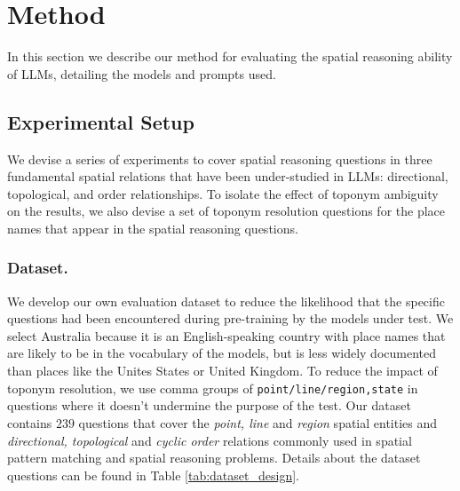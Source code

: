 \section{Method}
\label{section:method}

In this section we describe our method for evaluating the spatial reasoning ability of LLMs, detailing the models and prompts used.


\subsection{Experimental Setup}
We devise a series of experiments to cover spatial reasoning questions in three fundamental spatial relations that have been under-studied in LLMs: directional, topological, and order relationships.
To isolate the effect of toponym ambiguity on the results, we also devise a set of toponym resolution questions for the place names that appear in the spatial reasoning questions.

\subsubsection{Dataset.} 
We develop our own evaluation dataset to reduce the likelihood that the specific questions had been encountered during pre-training by the models under test. 
We select Australia because it is an English-speaking country with place names that are likely to be in the vocabulary of the models, but is less widely documented than places like the Unites States or United Kingdom. 
To reduce the impact of toponym resolution, we use comma groups of \texttt{point/line/region,state} in questions where it doesn't undermine the purpose of the test.
Our dataset contains $239$  questions that cover the \textit{point, line} and \textit{region} spatial entities and \textit{directional, topological} and \textit{cyclic order} relations commonly used in spatial pattern matching and spatial reasoning problems.
Details about the dataset questions can be found in Table \ref{tab:dataset_design}.



